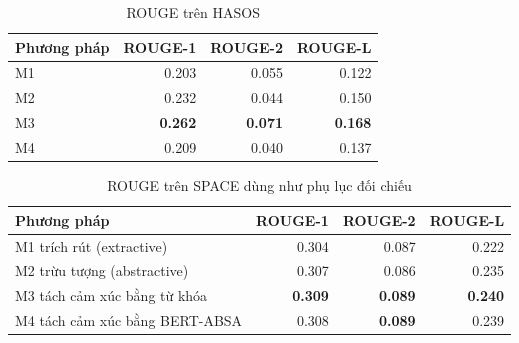 \documentclass[12pt,a4paper]{report}
\begin{document}
\begin{table}[tbp]
\centering
\caption{ROUGE trên HASOS}
\label{tab:production-rouge}
\begin{tabular}{l r r r}
\toprule
\textbf{Phương pháp} & \textbf{ROUGE-1} & \textbf{ROUGE-2} & \textbf{ROUGE-L} \\
\midrule
M1 & \num{0.203} & \num{0.055} & \num{0.122} \\
M2 & \num{0.232} & \num{0.044} & \num{0.150} \\
M3 & \textbf{\num{0.262}} & \textbf{\num{0.071}} & \textbf{\num{0.168}} \\
M4 & \num{0.209} & \num{0.040} & \num{0.137} \\
\bottomrule
\end{tabular}
\end{table}

\begin{table}[tbp]
\centering
\caption{ROUGE trên SPACE dùng như phụ lục đối chiếu}
\label{tab:space-rouge}
\begin{tabularx}{\textwidth}{Y r r r}
\toprule
\textbf{Phương pháp} & \textbf{ROUGE-1} & \textbf{ROUGE-2} & \textbf{ROUGE-L} \\
\midrule
M1 trích rút (extractive) & \num{0.304} & \num{0.087} & \num{0.222} \\
M2 trừu tượng (abstractive) & \num{0.307} & \num{0.086} & \num{0.235} \\
M3 tách cảm xúc bằng từ khóa & \textbf{\num{0.309}} & \textbf{\num{0.089}} & \textbf{\num{0.240}} \\
M4 tách cảm xúc bằng BERT-ABSA & \num{0.308} & \textbf{\num{0.089}} & \num{0.239} \\
\bottomrule
\end{tabularx}
\end{table}
\end{document}
